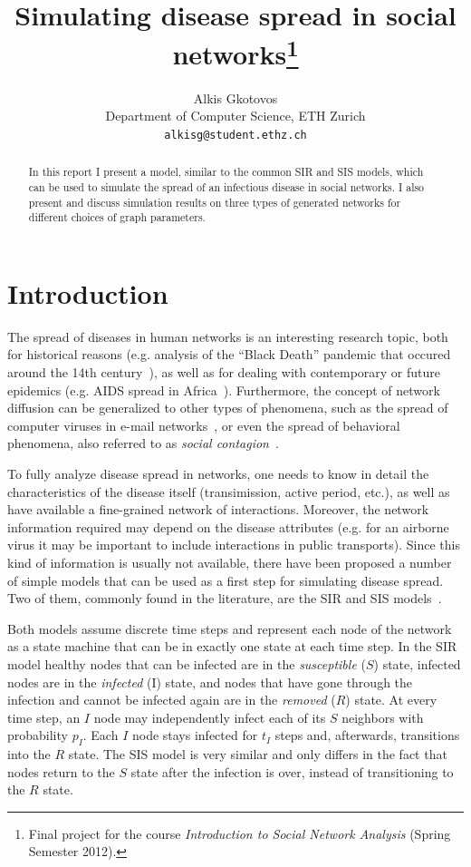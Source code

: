 \documentclass[11pt]{article} %
\title{Simulating disease spread in social networks\thanks{Final project
for the course \emph{Introduction to Social Network Analysis} (Spring
Semester 2012).}}
\author{
Alkis Gkotovos\\
Department of Computer Science, ETH Zurich\\
\texttt{alkisg@student.ethz.ch}
}
\begin{document}
\maketitle

\begin{abstract}
In this report I present a model, similar to the common SIR and SIS models,
which can be used to simulate the spread of an infectious disease in
social networks. I also present and discuss simulation results on three
types of generated networks for different choices of graph parameters.
\end{abstract}

\section{Introduction}
The spread of diseases in human networks is an interesting research topic, both
for historical reasons (e.g. analysis of the ``Black Death'' pandemic that occured
around the
14th century~\cite{blackdeath}), as well as for dealing with contemporary or
future epidemics (e.g. AIDS spread in Africa~\cite{aids}). Furthermore, the
concept of network diffusion can be generalized to other types of phenomena,
such as the spread of computer viruses in e-mail networks~\cite{email}, or even
the spread of behavioral phenomena, also referred to as
\emph{social contagion}~\cite{contagion}.

To fully analyze disease spread in networks, one needs to know in detail the
characteristics of the disease itself (transimission, active period, etc.),
as well as have available a fine-grained network of interactions. Moreover, the network
information required may depend on the disease attributes (e.g. for an airborne virus
it may be important to include interactions in public transports). Since this
kind of information is usually not available, there have been proposed a
number of simple models that can be used as a first step for simulating disease
spread. Two of them, commonly found in the literature, are the SIR and SIS
models~\cite{easley, newman}.

Both models assume discrete time steps and represent each node of the network
as a state machine that can be in exactly one state at each time step. In the
SIR model healthy nodes that can be infected are in the \emph{susceptible} ($S$)
state, infected nodes are in the \emph{infected} (I) state, and nodes that have
gone through the infection and cannot be infected again are in the \emph{removed}
($R$) state. At every time step, an $I$ node may independently infect each of
its $S$ neighbors with probability $p_I$. Each $I$ node stays infected for
$t_I$ steps and, afterwards, transitions into the $R$ state.
The SIS model is very similar and only differs in the fact that nodes return
to the $S$ state after the infection is over, instead of transitioning to the
$R$ state.
\end{document}
